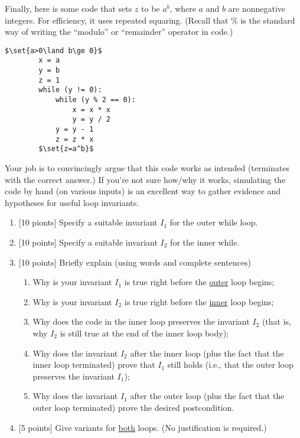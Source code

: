 \documentclass[12pt,letterpaper,boxed,cm]{hmcpset}
\newcommand{\set}[1]{\left\{#1\right\}}
\begin{document}
\begin{solution}
    \vfill
\end{solution}
\newpage

\begin{problem}[3.]
    [35 points] Finally, here is some code that sets $z$ to be $a^b$, where $a$ and $b$ are nonnegative integers. For efficiency, it uses repeated squaring. (Recall that \% is the standard way of writing the ``modulo'' or ``remainder'' operator in code.)
    \begin{lstlisting}[mathescape]
        $\set{a>0\land b\ge 0}$
        x = a
        y = b
        z = 1
        while (y != 0):
            while (y % 2 == 0):
                x = x * x
                y = y / 2
            y = y - 1
            z = z * x
        $\set{z=a^b}$
    \end{lstlisting}
    Your job is to convincingly argue that this code works as intended (terminates with the correct answer.) If you're not sure how/why it works, simulating the code by hand (on various inputs) is an excellent way to gather evidence and hypotheses for useful loop invariants.
    \begin{enumerate}[label=\Alph*.]
        \item {[10 pionts]} Specify a suitable invariant $I_1$ for the outer while loop.
        \item {[10 points]} Specify a suitable invariant $I_2$ for the inner while.
        \item {[10 points]} Briefly explain (using words and complete sentences)
        \begin{enumerate}[label=\alph*.]
            \item Why is your invariant $I_1$ is true right before the \ul{outer} loop begins;
            \item Why is your invariant $I_2$ is true right before the \ul{inner} loop begins;
            \item  Why does the code in the inner loop preserves the invariant $I_2$  (that is, why $I_2$ is still true at the end of the inner loop body);
            \item Why does the invariant $I_2$ after the inner loop (plus the fact that the inner loop terminated) prove that $I_1$ still holds (i.e., that the outer loop preserves the invariant $I_1$);
            \item Why does the invariant $I_1$ after the outer loop (plus the fact that the outer loop terminated) prove the desired postcondition.
        \end{enumerate}
        \item {[5 points]} Give variants for \ul{both} loops. (No justification is required.)
    \end{enumerate}
\end{problem}
\end{document}
